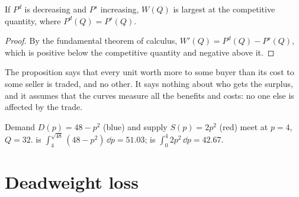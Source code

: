 \begin{proposition}\label{prop:b1:partial-equilibrium-welfare:efficiency}
If $P^d$ is decreasing and $P^s$ increasing, $W(Q)$ is largest at the
competitive quantity, where $P^d(Q) = P^s(Q)$.
\end{proposition}

\begin{proof}
By the fundamental theorem of calculus, $W'(Q) = P^d(Q) - P^s(Q)$, which is
positive below the competitive quantity and negative above it.
\end{proof}

The proposition says that every unit worth more to some buyer than its
cost to some seller is traded, and no other. It says nothing about who
gets the surplus, and it assumes that the curves measure all the benefits
and costs: no one else is affected by the trade.

\begin{omfigure}

{\small Demand $D(p) = 48 - p^2$ (blue) and supply $S(p) = 2p^2$ (red) meet at $p = 4$,
$Q = 32$.  is $\int_4^{\sqrt{48}}(48 - p^2)\,\dd p = 51.03$;  is
$\int_0^4 2p^2\,\dd p = 42.67$.}
\end{omfigure}

\section{Deadweight loss}\label{sec:b1:partial-equilibrium-welfare:dwl}

